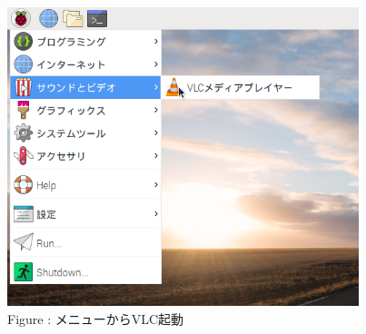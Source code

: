 \documentclass[a4paper,12pt]{jarticle}
\begin{document}
\begin{figure}[hb]
  \centering
  \begin{minipage}{10.917cm}
    {\upshape
      \includegraphics[height=8.715cm]{textbook-img113.png}
      \newline
      Figure : メニューからVLC起動}
  \end{minipage}
\end{figure}
\clearpage
\end{document}
